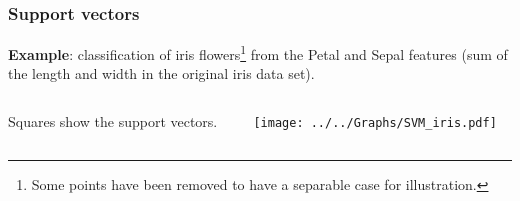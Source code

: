 \begin{frame}
\frametitle{Support vectors}
{\bf Example}: classification of iris flowers\footnote{Some points have been removed to have a separable case for illustration.} from the Petal and Sepal features (sum of the length and width in the original iris data set). 
\begin{columns}
\begin{column}{0.4\textwidth}
\vspace{-2cm}

Squares show the support vectors.
\end{column}
\begin{column}{0.6\textwidth}
\texttt{[image: ../../Graphs/SVM\_iris.pdf]} 
\end{column}
\end{columns}
\end{frame}
